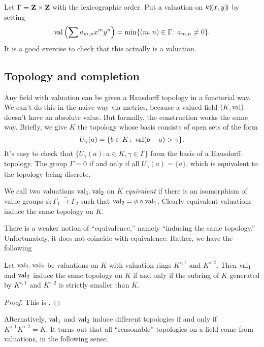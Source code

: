 \begin{example}
Let $\Gamma=\mathbf{Z}\times\mathbf{Z}$ with the lexicographic order. Put a valuation on 
$k(\!( x,y)\!)$ by setting 
\[
  \operatorname{val}\left(\sum a_{m,n} x^m y^n\right) = \min\{(m,n)\in \Gamma\colon a_{m,n}\ne 0\} .
\]
It is a good exercise to check that this actually is a valuation. 
\end{example}


\subsection{Topology and completion}

Any field with valuation can be given a Hausdorff topology in a functorial way. 
We can't do this in the naive way via metrics, because a valued field 
$(K,\operatorname{val})$ doesn't have an absolute value. But formally, the construction 
works the same way. Briefly, we give $K$ the topology whose basis consists of 
open sets of the form 
\[
  U_\gamma(a) = \{b\in K\colon \operatorname{val}(b-a)>\gamma\} .
\]
It's easy to check that $\{U_\gamma(a)\colon a\in K,\gamma\in \Gamma\}$ form 
the basis of a Hausdorff topology. The group $\Gamma=0$ if and only if all 
$U_\gamma(a)=\{a\}$, which is equivalent to the topology being discrete. 

We call two valuations $\operatorname{val}_1,\operatorname{val}_2$ on $K$ \emph{equivalent} if 
there is an isomorphism of value groups 
$\phi\colon\Gamma_1\xrightarrow\sim\Gamma_2$ such that 
$\operatorname{val}_2 = \phi\circ\operatorname{val}_1$. Clearly equivalent valuations induce 
the same topology on $K$. 

There is a weaker notion of ``equivalence,'' namely ``inducing the same 
topology.'' Unfortunately, it does not coincide with equivalence. Rather, we 
have the following 

\begin{theorem}
Let $\operatorname{val}_1,\operatorname{val}_2$ be valuations on $K$ with valuation rings 
$K^{\circ,1}$ and $K^{\circ,2}$. Then $\operatorname{val}_1$ and $\operatorname{val}_2$ induce 
the same topology on $K$ if and only if the subring of $K$ generated by 
$K^{\circ,1}$ and $K^{\circ,2}$ is strictly smaller than $K$. 
\end{theorem}
\begin{proof}
This is \cite[2.3.4]{engler-prestel}. 
\end{proof}

Alternatively, $\operatorname{val}_1$ and $\operatorname{val}_2$ induce different topologies if 
and only if $K^{\circ,1}K^{\circ,2} = K$. It turns out that all ``reasonable'' 
topologies on a field come from valuations, in the following sense. 


